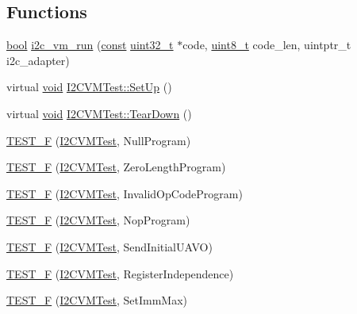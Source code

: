 \subsection*{Functions}
\begin{DoxyCompactItemize}
\item 
\hyperlink{group___exported__types_gaf6a258d8f3ee5206d682d799316314b1}{bool} \hyperlink{group___unit_tests_ga25fa33f408947a8b6015181705441220}{i2c\-\_\-vm\-\_\-run} (\hyperlink{group___n_a_m_e_ga7ae6d0e43244213b34de2c2b9aa30da6}{const} \hyperlink{stdint_8h_a435d1572bf3f880d55459d9805097f62}{uint32\-\_\-t} $\ast$code, \hyperlink{stdint_8h_aba7bc1797add20fe3efdf37ced1182c5}{uint8\-\_\-t} code\-\_\-len, uintptr\-\_\-t i2c\-\_\-adapter)
\item 
virtual \hyperlink{group___n_a_m_e_ga18028b8badbf1ea7e704ccac3c488e82}{void} \hyperlink{group___unit_tests_ga14dcb45d7859a9c686f96f3ca84013c4}{I2\-C\-V\-M\-Test\-::\-Set\-Up} ()
\item 
virtual \hyperlink{group___n_a_m_e_ga18028b8badbf1ea7e704ccac3c488e82}{void} \hyperlink{group___unit_tests_ga7c761569820d4a0ce44dc316e20870e7}{I2\-C\-V\-M\-Test\-::\-Tear\-Down} ()
\item 
\hyperlink{group___unit_tests_ga10c5fdc24984add2787d6dd8b945dec4}{T\-E\-S\-T\-\_\-\-F} (\hyperlink{class_i2_c_v_m_test}{I2\-C\-V\-M\-Test}, Null\-Program)
\item 
\hyperlink{group___unit_tests_ga0e38611807a8fda65d9205b4210b4eb6}{T\-E\-S\-T\-\_\-\-F} (\hyperlink{class_i2_c_v_m_test}{I2\-C\-V\-M\-Test}, Zero\-Length\-Program)
\item 
\hyperlink{group___unit_tests_gad02391e83795156c832c539efb040a39}{T\-E\-S\-T\-\_\-\-F} (\hyperlink{class_i2_c_v_m_test}{I2\-C\-V\-M\-Test}, Invalid\-Op\-Code\-Program)
\item 
\hyperlink{group___unit_tests_ga910c1f79944cb7a8b4dcbb6aad106cd0}{T\-E\-S\-T\-\_\-\-F} (\hyperlink{class_i2_c_v_m_test}{I2\-C\-V\-M\-Test}, Nop\-Program)
\item 
\hyperlink{group___unit_tests_ga368e9e15e13bc83e0a503fb312b095f9}{T\-E\-S\-T\-\_\-\-F} (\hyperlink{class_i2_c_v_m_test}{I2\-C\-V\-M\-Test}, Send\-Initial\-U\-A\-V\-O)
\item 
\hyperlink{group___unit_tests_gae71b9ce7ab11f166b843e3658a8ff438}{T\-E\-S\-T\-\_\-\-F} (\hyperlink{class_i2_c_v_m_test}{I2\-C\-V\-M\-Test}, Register\-Independence)
\item 
\hyperlink{group___unit_tests_ga0a655cc31302bf8e9372a3c5ba7540e0}{T\-E\-S\-T\-\_\-\-F} (\hyperlink{class_i2_c_v_m_test}{I2\-C\-V\-M\-Test}, Set\-Imm\-Max)

\end{DoxyCompactItemize}
